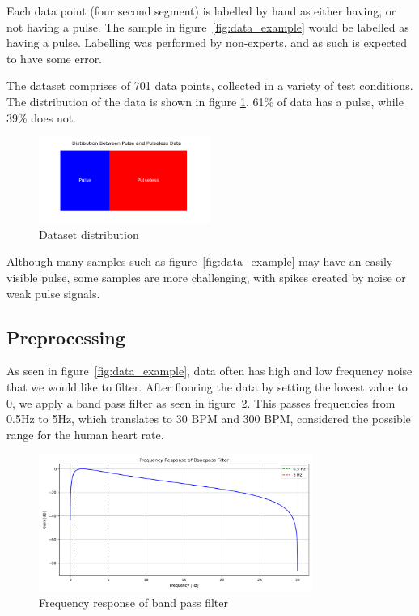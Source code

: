 \documentclass{article}
\begin{document}
Each data point (four second segment) is labelled by hand as either having, or not having a pulse. The sample in figure~\ref{fig:data_example} would be labelled as having a pulse. Labelling was performed by non-experts, and as such is expected to have some error.

The dataset comprises of 701 data points, collected in a variety of test conditions. The distribution of the data is shown in figure \ref{fig:pulse_distro}. 61\% of data has a pulse, while 39\% does not.

\begin{figure}[H]
    \centering
    \includegraphics[width=0.5\textwidth]{../media/pulse_bar.png}
    \caption{Dataset distribution}
    \label{fig:pulse_distro}
\end{figure}

Although many samples such as figure~\ref{fig:data_example} may have an easily visible pulse, some samples are more challenging, with spikes created by noise or weak pulse signals. 

\subsection{Preprocessing}

As seen in figure~\ref{fig:data_example}, data often has high and low frequency noise that we would like to filter. After flooring the data by setting the lowest value to 0, we apply a band pass filter as seen in figure~\ref{fig:bpf}. This passes frequencies from 0.5Hz to 5Hz, which translates to 30 BPM and 300 BPM, considered the possible range for the human heart rate.

\begin{figure}[H]
    \centering
    \includegraphics[width=0.8\textwidth]{../media/bpf.png}
    \caption{Frequency response of band pass filter}
    \label{fig:bpf}
\end{figure}
\end{document}
